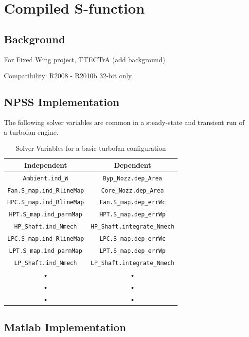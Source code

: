 \documentclass[heading.tex]{subfiles}
\begin{document}
\section{Compiled S-function}
\subsection{Background}
For Fixed Wing project, TTECTrA (add background)

Compatibility: R2008 - R2010b 32-bit only.

\subsection{NPSS Implementation}

The following solver variables are common in a steady-state and transient run of a turbofan
engine.

\begin{table}[H]
\centering
\begin{tabular}{|c|c|}
\hline 
Independent & Dependent \\ 
\hline \hline
\texttt{Ambient.ind\_W} & \texttt{Byp\_Nozz.dep\_Area} \\ 
\hline 
\texttt{Fan.S\_map.ind\_RlineMap} & \texttt{Core\_Nozz.dep\_Area} \\ 
\hline 
\texttt{HPC.S\_map.ind\_RlineMap} & \texttt{Fan.S\_map.dep\_errWc} \\ 
\hline 
\texttt{HPT.S\_map.ind\_parmMap} & \texttt{HPT.S\_map.dep\_errWp} \\ 
\hline 
\texttt{HP\_Shaft.ind\_Nmech} & \texttt{HP\_Shaft.integrate\_Nmech} \\ 
\hline 
\texttt{LPC.S\_map.ind\_RlineMap} & \texttt{LPC.S\_map.dep\_errWc} \\ 
\hline 
\texttt{LPT.S\_map.ind\_parmMap} & \texttt{LPT.S\_map.dep\_errWp} \\ 
\hline 
\texttt{LP\_Shaft.ind\_Nmech} & \texttt{LP\_Shaft.integrate\_Nmech} \\ 
\hline 
• & • \\ 
\hline 
• & • \\ 
\hline 
• & • \\ 
\hline 
\end{tabular} 
\caption{Solver Variables for a basic turbofan configuration}
\label{tab:SolverVariables}
\end{table}


\subsection{Matlab Implementation}
\end{document}
